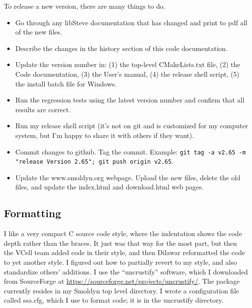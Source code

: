 \documentclass {scrbook}
\newcommand {\ttt} {\texttt}
\begin{document}
To release a new version, there are many things to do.
\begin{itemize}

\item Go through any libSteve documentation that has changed and print to pdf all of the new files.

\item Describe the changes in the history section of this code documentation.

\item Update the version number in: (1) the top-level CMakeLists.txt file, (2) the Code documentation, (3) the User's manual, (4) the release shell script, (5) the install batch file for Windows.

\item Run the regression tests using the latest version number and confirm that all results are correct.

\item Run my release shell script (it's not on git and is customized for my computer system, but I'm happy to share it with others if they want).

\item Commit changes to github. Tag the commit. Example: \ttt{git tag -a v2.65 -m "release Version 2.65"; git push origin v2.65}.

\item Update the www.smoldyn.org webpage. Upload the new files, delete the old files, and update the index.html and download.html web pages.

\end{itemize}

\subsection{Formatting}

I like a very compact C source code style, where the indentation shows the code depth rather than the braces. It just was that way for the most part, but then the VCell team added code in their style, and then Dilawar reformatted the code to yet another style. I figured out how to partially revert to my style, and also standardize others' additions. I use the ``uncrustify'' software, which I downloaded from SourceForge at \url{https://sourceforge.net/projects/uncrustify/}. The package currently resides in my Smoldyn top level directory. I wrote a configuration file called ssa.cfg, which I use to format code; it is in the uncrustify directory.
\end{document}
